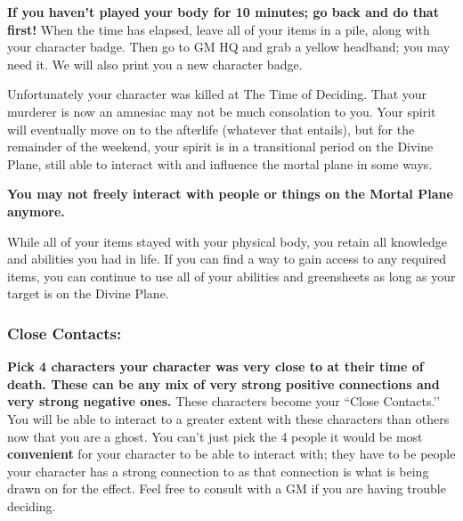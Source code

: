 \documentclass[green]{GL2020}
\begin{document}
\name{\gLifeAfterDeath{}}

\textbf{If you haven't played your body for 10 minutes; go back and do that first!} When the time has elapsed, leave all of your items in a pile, along with your character badge. Then go to GM HQ and grab a yellow headband; you may need it. We will also print you a new character badge.

Unfortunately your character was killed at The Time of Deciding. That your murderer is now an amnesiac may not be much consolation to you. Your spirit will eventually move on to the afterlife (whatever that entails), but for the remainder of the weekend, your spirit is in a transitional period on the Divine Plane, still able to interact with and influence the mortal plane in some ways.

\textbf{{\large You may not freely interact with people or things on the Mortal Plane anymore.}}

While all of your items stayed with your physical body, you retain all knowledge and abilities you had in life. If you can find a way to gain access to any required items, you can continue to use all of your abilities and greensheets as long as your target is on the Divine Plane.

\subsubsection*{Close Contacts:} 
\textbf{Pick 4 characters your character was very close to at their time of death. These can be any mix of very strong positive connections and very strong negative ones.} These characters become your ``Close Contacts.’’ You will be able to interact to a greater extent with these characters than others now that you are a ghost. You can’t just pick the 4 people it would be most \textbf{convenient} for your character to be able to interact with; they have to be people your character has a strong connection to as that connection is what is being drawn on for the effect. Feel free to consult with a GM if you are having trouble deciding.
\end{document}
